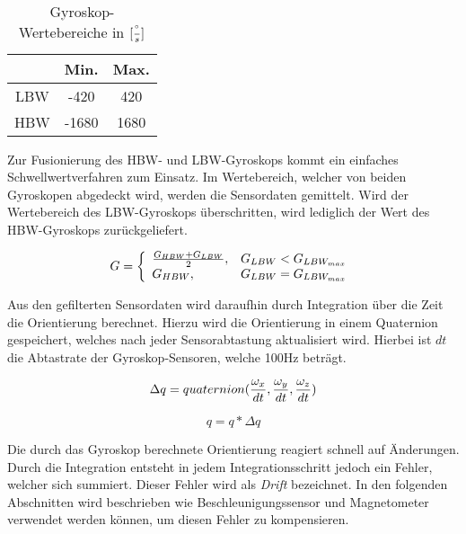 \begin{table}[ht]
  \centering
  \begin{tabular}{ | c | c | c | }
    \hline
    & Min. & Max. \\ \hline
    \ac{LBW} & -420   & 420   \\ \hline
    \ac{HBW} & -1680   & 1680   \\
    \hline
  \end{tabular}
  \caption{Gyroskop-Wertebereiche in $[{\degree \over s}]$}
  \label{tab:ranges-gyros}
\end{table}


Zur Fusionierung des \ac{HBW}- und \ac{LBW}-Gyroskops kommt ein einfaches Schwellwertverfahren zum Einsatz. 
Im Wertebereich, welcher von beiden Gyroskopen abgedeckt wird, werden
die Sensordaten gemittelt. Wird der Wertebereich des \ac{LBW}-Gyroskops
überschritten, wird lediglich der Wert des \ac{HBW}-Gyroskops
zurückgeliefert.

\begin{equation}
    G = \left\{
    \begin{array}{ll}
        \frac{G_{HBW} + G_{LBW}}{2}, & G_{LBW} < G_{LBW_{max}}  \\
        G_{HBW}, & G_{LBW} = G_{LBW_{max}}
    \end{array}\right. \\
\end{equation}


Aus den gefilterten Sensordaten wird daraufhin durch Integration über
die Zeit die Orientierung berechnet. Hierzu wird die Orientierung in einem Quaternion gespeichert, welches nach jeder Sensorabtastung aktualisiert wird. Hierbei ist $dt$ die Abtastrate der Gyroskop-Sensoren, welche 100Hz beträgt.

\begin{equation}
    \Delta q = quaternion({\omega_x \over dt}, {\omega_y \over dt}, {\omega_z \over dt}) \\
\end{equation}

\begin{equation}
    q = q * \Delta q
\end{equation}

Die durch das Gyroskop berechnete Orientierung reagiert schnell auf
Änderungen. Durch die Integration entsteht in jedem Integrationsschritt jedoch ein Fehler, welcher sich summiert. Dieser Fehler wird als \emph{Drift} bezeichnet. In den folgenden Abschnitten wird beschrieben wie Beschleunigungssensor und Magnetometer verwendet werden können, um diesen Fehler zu kompensieren.

